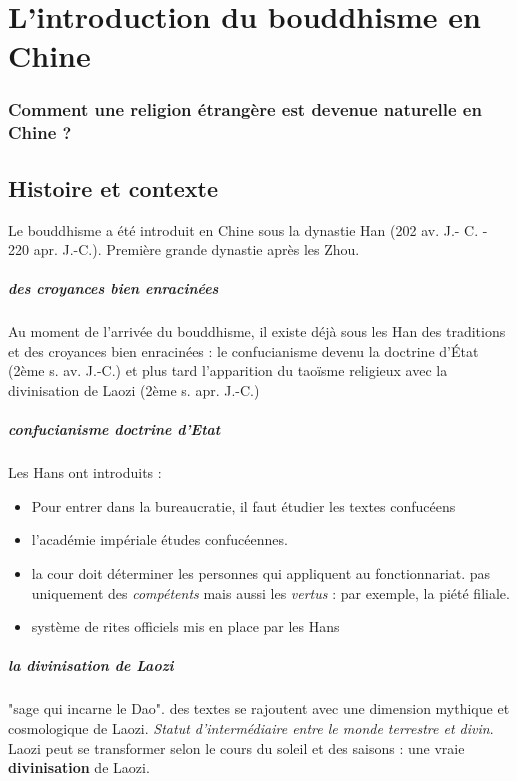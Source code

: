 \chapter{L’introduction du bouddhisme en Chine}

\subsection{Comment une religion étrangère est devenue naturelle en Chine ?}




\section{Histoire et contexte}
 
Le bouddhisme a été introduit en Chine sous la dynastie Han (202 av. J.- C. - 220 apr. J.-C.). Première grande dynastie après les Zhou.

\paragraph{des croyances bien enracinées} Au moment de l’arrivée du bouddhisme, il existe déjà sous les Han des traditions et des croyances bien enracinées : le confucianisme devenu la doctrine d’État (2ème s. av. J.-C.) et plus tard l’apparition du taoïsme religieux avec la divinisation de Laozi (2ème s. apr. J.-C.)

\paragraph{confucianisme doctrine d'Etat}
Les Hans ont introduits : 
\begin{itemize}
    \item Pour entrer dans la bureaucratie, il faut étudier les textes confucéens

\item {l'académie impériale} études confucéennes. 
\item la cour doit déterminer les personnes qui appliquent au fonctionnariat. pas uniquement des \textit{compétents} mais aussi les \textit{vertus} : par exemple, la piété filiale.

\item système de rites officiels mis en place par les Hans
\end{itemize}

\paragraph{la divinisation de Laozi} "sage qui incarne le Dao". des textes se rajoutent avec une dimension mythique et cosmologique de Laozi. \textit{Statut d'intermédiaire entre le monde terrestre et divin}. Laozi peut se transformer selon le cours du soleil et des saisons : une vraie \textbf{divinisation} de Laozi.

